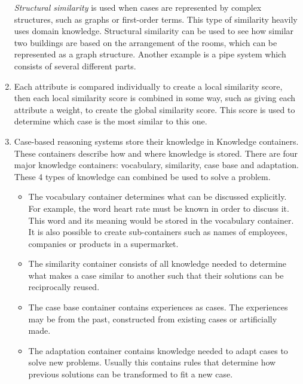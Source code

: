 \documentclass[a4paper]{article}
\begin{document}
\begin{enumerate}
        \emph{Structural similarity} is used when cases are represented by
        complex structures, such as graphs or first-order terms. This type of
        similarity heavily uses domain knowledge. Structural similarity can be
        used to see how similar two buildings are based on the arrangement of the
        rooms, which can be represented as a graph structure. Another example is
        a pipe system which consists of several different parts.
    \item
        Each attribute is compared individually to create a local similarity
        score, then each local similarity score is combined in some way, such as
        giving each attribute a weight, to create the global similarity score.
        This score is used to determine which case is the most similar to this
        one.
    \item
        Case-based reasoning systems store their knowledge in Knowledge
        containers. These containers describe how and where knowledge is stored.
        There are four major knowledge containers: vocabulary, similarity, case
        base and adaptation. These 4 types of knowledge can combined be used to
        solve a problem. 

        \begin{itemize}
            \item
                The vocabulary container determines what can be discussed
                explicitly. For example, the word heart rate must be known in
                order to discuss it. This word and its meaning would be stored
                in the vocabulary container. It is also possible to create
                sub-containers such as names of employees, companies or products
                in a supermarket.
            \item
                The similarity container consists of all knowledge needed to
                determine what makes a case similar to another such that their
                solutions can be reciprocally reused.
            \item
                The case base container contains experiences as cases. The
                experiences may be from the past, constructed from existing
                cases or artificially made.
            \item
                The adaptation container contains knowledge needed to adapt
                cases to solve new problems. Usually this contains rules that
                determine how previous solutions can be transformed to fit a new
                case.
        \end{itemize}
\end{enumerate}
\end{document}
